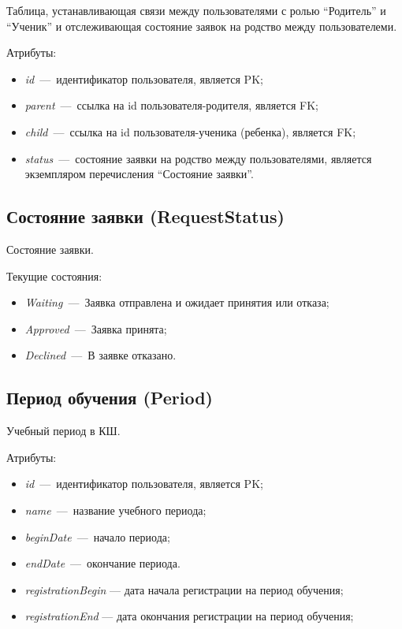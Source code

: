 \documentclass[14pt]{article}
\begin{document}
Таблица, устанавливающая связи между пользователями с ролью ``Родитель'' и ``Ученик'' и отслеживающая состояние заявок на родство между пользователеми.

Атрибуты:
\begin{itemize}
	\item \emph{id}~---~идентификатор пользователя, является PK;
	\item \emph{parent}~---~ссылка на id пользователя-родителя, является FK;
	\item \emph{child}~---~ссылка на id пользователя-ученика (ребенка), является FK;
	\item \emph{status}~---~состояние заявки на родство между пользователями, является экземпляром перечисления ``Состояние заявки''.
\end{itemize}


\subsection{Состояние заявки (RequestStatus)}

Состояние заявки.

Текущие состояния:
\begin{itemize}
	\item \emph{Waiting}~---~Заявка отправлена и ожидает принятия или отказа;
	\item \emph{Approved}~---~Заявка принята;
	\item \emph{Declined}~---~В заявке отказано.
\end{itemize}

\subsection{Период обучения (Period)}

Учебный период в КШ.

Атрибуты:
\begin{itemize}
	\item \emph{id}~---~идентификатор пользователя, является PK;
	\item \emph{name}~---~название учебного периода;
	\item \emph{beginDate}~---~начало периода;
	\item \emph{endDate}~---~окончание периода.
	\item \emph{registrationBegin} --- дата начала регистрации на период обучения;
	\item \emph{registrationEnd} --- дата окончания регистрации на период обучения;
\end{itemize}
	
\end{document}
